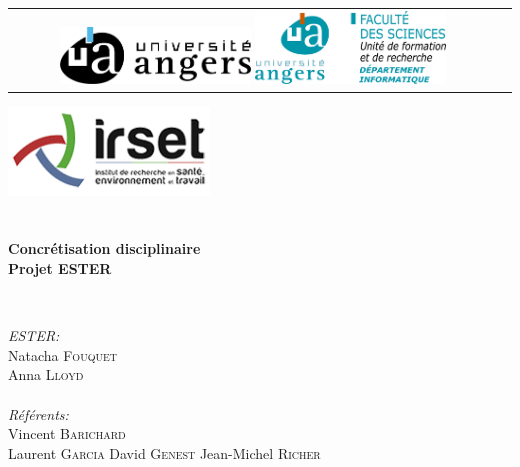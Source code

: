 
\begin{titlepage}
    \begin{center}
    
    
    \begin{tabular}{cc}
  \includegraphics[width=0.4\textwidth]{./img/ua_h_couleur}
  \hspace{4cm}
    \includegraphics[width=0.4\textwidth]{./img/Dpt_Info}
	\end{tabular}    
    
      \vspace{1cm}

	
	\includegraphics[width=0.4\textwidth]{./img/irset}~\\[1cm]

    
    \textsc{\Large }\\[0.5cm]
    
    \HRule \\[0.4cm]
    
    {\huge \bfseries Concrétisation disciplinaire\\
   Projet ESTER \\[0.4cm] }
    
    \HRule \\[1.5cm]
    
    \begin{minipage}{0.4\textwidth}
    \begin{flushleft} \large
    
     \emph{ESTER:}\\
    Natacha \textsc{Fouquet}\\
    Anna \textsc{Lloyd}\\
    \textsc{\Large }\\[0.3cm]
    \emph{Référents:}\\
    Vincent \textsc{Barichard}\\
    Laurent \textsc{Garcia}
    David \textsc{Genest}
    Jean-Michel \textsc{Richer}
    

\end{flushleft}
\end{minipage}
\end{center}
\end{titlepage}
